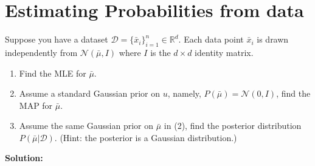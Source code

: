 \documentclass[11pt]{article}
\begin{document}
		\section*{Estimating Probabilities from data}
		Suppose you have a dataset $\mathcal{D} = \{\bar{x}_i\}_{i=1}^n \in \mathbb{R}^d$. Each data point $\bar{x}_i$ is drawn independently from $\mathcal{N}(\bar{\mu}, I)$ where $I$ is the $d \times d$ identity matrix.
		\begin{enumerate}
			\item Find the MLE for $\bar{\mu}$.
			\item Assume a standard Gaussian prior on $u$, namely, $P(\bar{\mu}) = \mathcal{N}(0, I)$, find the MAP for $\bar{\mu}$.
			\item Assume the same Gaussian prior on $\bar{\mu}$ in (2), find the posterior distribution $P(\bar{\mu} | \mathcal{D})$. (Hint: the posterior is a Gaussian distribution.)
		\end{enumerate}
		
		\textbf{Solution: }
		
\end{document}

